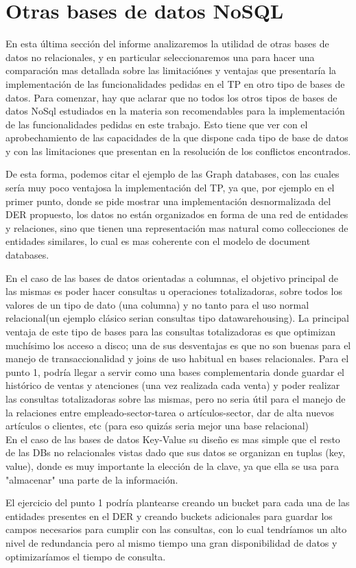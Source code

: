 \section{Otras bases de datos NoSQL}

En esta \'ultima secci\'on del informe analizaremos la utilidad de otras bases de datos no relacionales, y en particular seleccionaremos una para hacer una comparaci\'on mas detallada sobre las limitaci\'ones y ventajas que presentar\'ia la implementaci\'on de las funcionalidades pedidas en el TP en otro tipo de bases de datos. Para comenzar, hay que aclarar que no todos los otros tipos de bases de datos NoSql estudiados en la materia son recomendables para la implementaci\'on de las funcionalidades pedidas en este trabajo. Esto tiene que ver con el aprobechamiento de las capacidades de la que dispone cada tipo de base de datos y con las limitaciones que presentan en la resoluci\'on de los conflictos encontrados. 

De esta forma, podemos citar el ejemplo de las Graph databases, con las cuales ser\'ia muy poco ventajosa la implementaci\'on del TP, ya que, por ejemplo en el primer punto, donde se pide mostrar una implementaci\'on desnormalizada del DER propuesto, los datos no est\'an organizados en forma de una red de entidades y relaciones, sino que tienen una representaci\'on mas natural como collecciones de entidades similares, lo cual es mas coherente con el modelo de document databases.

En el caso de las bases de datos orientadas a columnas, el objetivo principal de las mismas es poder hacer consultas u operaciones totalizadoras, sobre todos los valores de un tipo de dato (una columna) y no tanto para el uso normal relacional(un ejemplo clásico serian consultas tipo datawarehousing). La principal ventaja de este tipo de bases para las consultas totalizadoras es que optimizan muchísimo los acceso a disco; una de sus desventajas es que no son buenas para el manejo de transaccionalidad y joins de uso habitual en bases relacionales.
Para el punto 1, podría llegar a servir como una bases complementaria donde guardar el histórico de ventas y atenciones (una vez realizada cada venta) y poder realizar las consultas totalizadoras sobre las mismas, pero no seria útil para el manejo de la relaciones entre empleado-sector-tarea o artículos-sector, dar de alta nuevos artículos o clientes, etc (para eso quizás seria mejor una base relacional) \\

En el caso de las bases de datos Key-Value su dise\~no es mas simple que el resto de las DBs no relacionales vistas dado que sus datos se organizan en tuplas (key, value), donde es muy importante la elecci\'on de la clave, ya que ella se usa para "almacenar" una parte de la informaci\'on. 

El ejercicio del punto 1 podr\'ia plantearse creando un bucket para cada una de las entidades presentes en el DER y creando buckets adicionales para guardar los campos necesarios para cumplir con las consultas, con lo cual tendr\'iamos un alto nivel de redundancia pero al mismo tiempo una gran disponibilidad de datos y optimizar\'iamos el tiempo de consulta.



